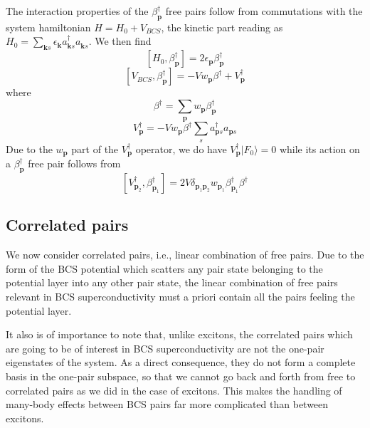 \documentclass[aps,prb,preprint,groupedaddress,amsmath]{revtex4-1}
\newcommand{\vp}{\ensuremath{\mathbf{p}}}
\newcommand{\vk}{\ensuremath{\mathbf{k}}}
\newcommand{\dg}{\ensuremath{\dagger}}
\begin{document}
The interaction properties of the $\beta_\vp^\dg$ free pairs follow from commutations with the system hamiltonian $H=H_0+V_{BCS}$, the kinetic part reading as $H_0=\sum_{\vk{s}}\epsilon_\vk{}a^\dg_{\vk{s}}a^{}_{\vk{s}}$. We then find
\begin{equation}  \label{eq:betaH}
\left[H_0,\beta^{\dagger}_\vp\right]  =2\epsilon_\vp\beta^{\dagger}_\vp
\end{equation}
\begin{equation}  \label{eq:vbeta}
\left[V_{BCS},\beta^{\dagger}_\vp\right] 
=-Vw^{}_\vp\beta^{\dagger}+V^{\dagger}_\vp
\end{equation}
where 
\begin{equation}
\beta^{\dagger}=\sum_\vp{}w_\vp\beta^{\dagger}_\vp
\end{equation}
\begin{equation}
V^\dg_\vp=-Vw^{}_\vp\beta^{\dagger}\sum_s{}a^\dg_{\vp{s}}a^{}_{\vp{s}}
\end{equation}
Due to the $w_\vp$ part of the $V^\dg_\vp$ operator, we do have $V^\dg_\vp|F_0{\rangle}=0$ while its action on a $\beta_\vp^\dg$ free pair follows from 
\begin{equation}  \label{eq:vpotbeta}
\left[V^{\dagger}_{\mathbf{p} _2},\beta^{\dagger}_{\mathbf{p} _1}\right] 
=2V\delta_{\mathbf{p} _1\mathbf{p} _2}w_{\mathbf{p} _1}\beta^{\dagger}_{\mathbf{p} _1}\beta^{\dagger}_{}
\end{equation}

\subsection{Correlated pairs}


We now consider correlated pairs, i.e., linear combination of free pairs. Due to the form of the BCS potential which scatters any pair state belonging to the potential layer into any other pair state, the linear combination of free pairs relevant in BCS superconductivity must a priori contain all the pairs feeling the potential layer.

 It also is of importance to note that, unlike excitons, the correlated pairs which are going to be of interest in BCS superconductivity are not the one-pair eigenstates of the system. As a direct consequence, they do not form a complete basis in the one-pair subspace, so that we cannot go back and forth from free to correlated pairs as we did in the case of excitons. This makes the handling of many-body effects between BCS pairs far more complicated than between excitons. 
\end{document}
